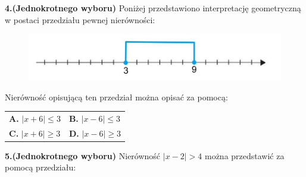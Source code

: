 \documentclass[12pt,a4paper]{article}
\theoremstyle{break}
\begin{document}
\begin{mdframed}[style=zad]
		\vspace{0.2cm}
		\textbf{4.}\textbf{(Jednokrotnego wyboru)} Poniżej przedstawiono interpretację geometryczną w postaci przedziału pewnej nierówności:
	\end{mdframed}

\begin{figure}[h]
	\centering
	\includegraphics[scale=0.5]{z1_1.jpeg}
\end{figure}

Nierówność opisującą ten przedział można opisać za pomocą:

\vspace{0.5cm}
\begin{tabular}{p{5cm} p{5cm}}
	\textbf{A. }$|x+6|\leq3$&
	\textbf{B. }$|x-6|\leq3$\\
	\textbf{C. }$|x+6|\geq3$&
	\textbf{D. }$|x-6|\geq3$\\
\end{tabular}

\begin{mdframed}[style=zad]
	\vspace{0.2cm}
	\textbf{5.}$  $\textbf{(Jednokrotnego wyboru)} Nierówność $|x-2|>4$ można przedstawić za pomocą przedziału:
\end{mdframed}
\end{document}
